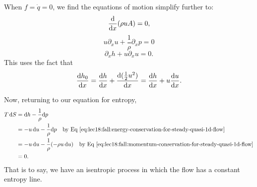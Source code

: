 \begin{node}
When $f=\dot{q}=0$, we find the equations of motion simplify further to:
\begin{equation}
\frac{\mathrm{d}}{\mathrm{d} x}(\rho u A)=0,
\end{equation}
\begin{equation}\label{eq:lec18:fall:momentum-conservation-for-steady-quasi-1d-flow}
u\partial_{x}u + \frac{1}{\rho}\partial_{x}p=0
\end{equation}
\begin{equation}\label{eq:lec18:fall:energy-conservation-for-steady-quasi-1d-flow}
\partial_{x}h+u\partial_{x}u=0.
\end{equation}
This uses the fact that
\begin{equation}
\frac{\mathrm{d} h_{0}}{\mathrm{d} x}=\frac{\mathrm{d} h}{\mathrm{d} x} +
\frac{\mathrm{d}(\frac{1}{2}u^{2})}{\mathrm{d} x}=\frac{\mathrm{d} h}{\mathrm{d} x}+u\frac{\mathrm{d} u}{\mathrm{d} x}.
\end{equation}
\end{node}

\begin{node}
Now, returning to our equation for entropy,
\begin{subequations}
  \begin{align}
T\,\mathrm{d} S &= \mathrm{d} h - \frac{1}{\rho}\mathrm{d} p\\
&= -u\,\mathrm{d} u - \frac{1}{\rho}\mathrm{d} p\quad\mbox{by Eq~\eqref{eq:lec18:fall:energy-conservation-for-steady-quasi-1d-flow}}\\
&= -u\,\mathrm{d} u - \frac{1}{\rho}(-\rho u\,\mathrm{d} u)\quad\mbox{by Eq~\eqref{eq:lec18:fall:momentum-conservation-for-steady-quasi-1d-flow}}\\
&= 0.
  \end{align}
\end{subequations}
That is to say, we have an isentropic process in which the flow has a
constant entropy line.
\end{node}